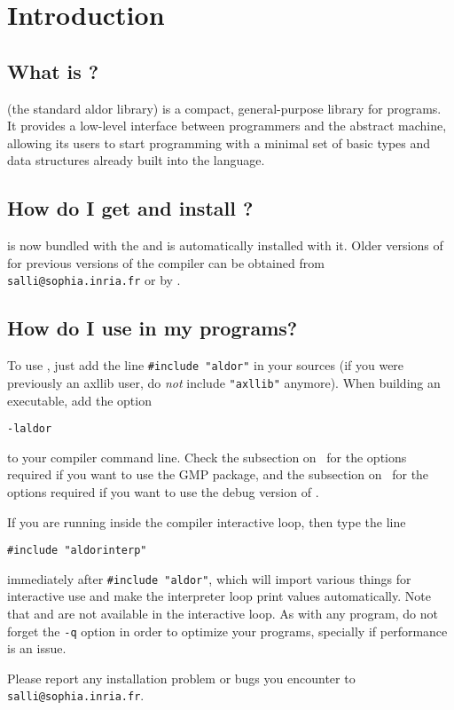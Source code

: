 \section{Introduction}

\subsection*{What is \salli?}
\salli (the standard aldor library) is a compact, general-purpose
library for \aldor programs.
It provides a low-level interface between \aldor programmers and the
abstract machine, allowing its users to start programming with a minimal
set of basic types and data structures already built into the language.

\subsection*{How do I get and install \salli?}
\libaldor{} is now bundled with the
and is automatically installed with it. Older
versions of \salli{} for previous versions of the compiler can be obtained
from {\tt salli@sophia.inria.fr} or by
.

\subsection*{How do I use \salli in my programs?}
To use \salli, just add the line {\tt \#include "aldor"}
in your \aldor sources (if you were previously an axllib user,
do {\em not} include {\tt "axllib"} anymore).
When building an executable, add the option
\begin{center}
{\tt -laldor}
\end{center}
to your compiler command line.
Check the subsection on~
for the options required if you want to use the GMP package,
and the subsection on~
for the options required if you want to use the debug version
of \libaldor.

If you are running \salli inside the compiler interactive loop, then
type the line
\begin{center}
{\tt \#include "aldorinterp"}
\end{center}
immediately after {\tt \#include "aldor"},
which will import various things for interactive use and make the interpreter
loop print values automatically.
Note that  and
 are not available in the interactive loop.
As with any \aldor program, do not forget
the {\tt -q} option in order to optimize your programs, specially
if performance is an issue.

Please report any installation problem or bugs you encounter
to {\tt salli@sophia.inria.fr}.
